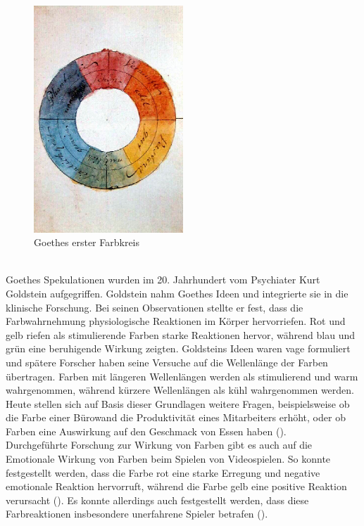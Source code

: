 \documentclass[./dokumentation.tex]{subfiles}
\begin{document}
\begin{figure}[H]
    \centering
    \includegraphics[width=0.5\textwidth]{bilder/goethe.jpg}
    \caption{Goethes erster Farbkreis \cite{goethe1809}}
    \label{fig8:goethe}
\end{figure}\\

Goethes Spekulationen wurden im 20. Jahrhundert vom Psychiater Kurt Goldstein aufgegriffen. Goldstein nahm Goethes Ideen und integrierte sie in die klinische Forschung. Bei seinen Observationen stellte er fest, dass die Farbwahrnehmung physiologische Reaktionen im Körper hervorriefen. Rot und gelb riefen als stimulierende Farben starke Reaktionen hervor, während blau und grün eine beruhigende Wirkung zeigten. Goldsteins Ideen waren vage formuliert und spätere Forscher haben seine Versuche auf die Wellenlänge der Farben übertragen. Farben mit längeren Wellenlängen werden als stimulierend und warm wahrgenommen, während kürzere Wellenlängen als kühl wahrgenommen werden. \\

Heute stellen sich auf Basis dieser Grundlagen weitere Fragen, beispielsweise ob die Farbe einer Bürowand die Produktivität eines Mitarbeiters erhöht, oder ob Farben eine Auswirkung auf den Geschmack von Essen haben (\cite{elliot2004}).\\

Durchgeführte Forschung zur Wirkung von Farben gibt es auch auf die Emotionale Wirkung von Farben beim Spielen von Videospielen. So konnte festgestellt werden, dass die Farbe rot eine starke Erregung und negative emotionale Reaktion hervorruft, während die Farbe gelb eine positive Reaktion verursacht (\cite{joosten}). Es konnte allerdings auch festgestellt werden, dass diese Farbreaktionen insbesondere unerfahrene Spieler betrafen (\cite{joosten}).\\
\end{document}
